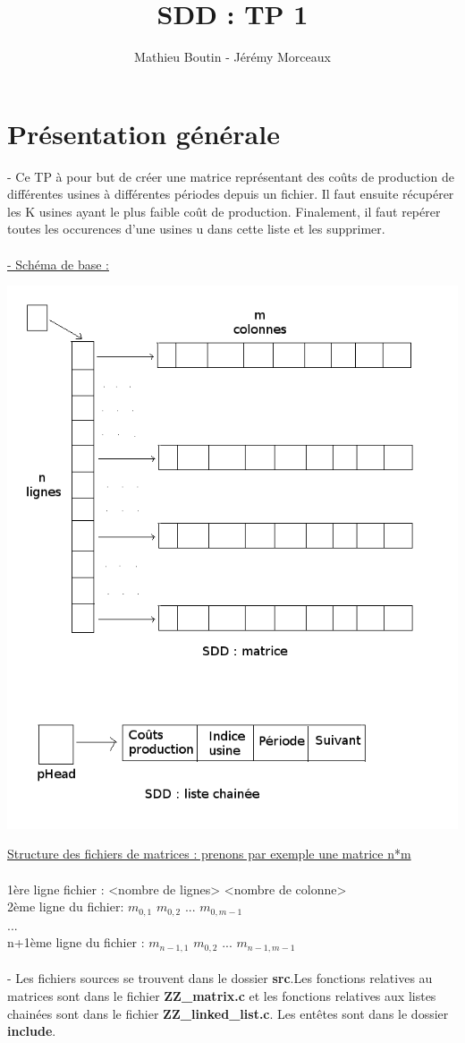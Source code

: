 \documentclass[a4paper]{article}
\title{SDD : TP 1}
\author{Mathieu Boutin - Jérémy Morceaux}
\begin{document}
\maketitle
\section{Présentation générale}
- Ce TP à pour but de créer une matrice représentant des coûts de production de différentes usines à différentes périodes depuis un fichier. Il faut ensuite récupérer les K usines ayant le plus faible coût de production. Finalement, il faut repérer toutes les occurences d'une usines u dans cette liste et les supprimer.
\\
\\
\underline{- Schéma de base :}
\begin{center}
\includegraphics[scale=0.39]{sdd.png}
\end{center}

\underline{Structure des fichiers de matrices : prenons par exemple une matrice n*m}
\\
\\
1ère ligne fichier : <nombre de lignes> <nombre de colonne>
\\
2ème ligne du fichier: $m_{0,1}$ $m_{0,2}$  ... $m_{0,m-1}$
\\
...
\\
n+1ème ligne du fichier : $m_{n-1,1}$ $m_{0,2}$  ... $m_{n-1,m-1}$
\\
\\
- Les fichiers sources se trouvent dans le dossier \textbf{src}.Les fonctions relatives au matrices sont dans le fichier \textbf{ZZ\_matrix.c} et les fonctions relatives aux listes chainées sont dans le fichier \textbf{ZZ\_linked\_list.c}. Les entêtes sont dans le dossier \textbf{include}.
\end{document}
